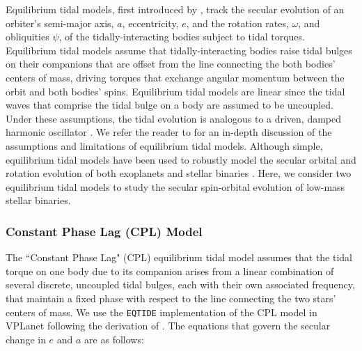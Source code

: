\documentclass[twocolumn]{aastex61}
\newcommand{\eqtide}[0]{\texttt{EQTIDE}\xspace}
\begin{document}
 Equilibrium tidal models, first introduced by \citep{Darwin1880}, track the secular evolution of an orbiter's semi-major axis, $a$, eccentricity, $e$, and the rotation rates, $\omega$, and obliquities $\psi$, of the tidally-interacting bodies subject to tidal torques. Equilibrium tidal models assume that tidally-interacting bodies raise tidal bulges on their companions that are offset from the line connecting the both bodies' centers of mass, driving torques that exchange angular momentum between the orbit and both bodies' spins. Equilibrium tidal models are linear since the tidal waves that comprise the tidal bulge on a body are assumed to be uncoupled. Under these assumptions, the tidal evolution is analogous to a driven, damped harmonic oscillator \citep{Greenberg2009}.  We refer the reader to \citet{Barnes2017} for an in-depth discussion of the assumptions and limitations of equilibrium tidal models.  Although simple, equilibrium tidal models have been used to robustly model the secular orbital and rotation evolution of both exoplanets \citet[e.g.][]{Goldreich1966,Jackson2009,Leconte2010,Heller2011,Barnes2013,Barnes2017} and stellar binaries \citep[e.g.][]{Repetto2014,Fleming2018}.  Here, we consider two equilibrium tidal models to study the secular spin-orbital evolution of low-mass stellar binaries.  

\subsubsection{Constant Phase Lag (CPL) Model}

The ``Constant Phase Lag" (CPL) \citep[][]{FerrazMello2008,Heller2011} equilibrium tidal model assumes that the tidal torque on one body due to its companion arises from a linear combination of several discrete, uncoupled tidal bulges, each with their own associated frequency, that maintain a fixed phase with respect to the line connecting the two stars' centers of mass. We use the \eqtide implementation of the CPL model in VPLanet following the derivation of \citet{FerrazMello2008}.  The equations that govern the secular change in $e$ and $a$ are as follows:
\end{document}
